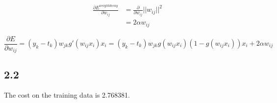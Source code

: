 \documentclass{article}
\begin{document}
\begin{align*}
	\frac{\partial E^{weightdecay}}{\partial w_{ij}} &= \frac{\partial}{\partial w_{ij}} ||w_{ij}||^2 \\&= 2\alpha w_{ij}
\end{align*}

\begin{equation}
\frac{\partial E}{\partial w_{ij}} = (y_k-t_k)w_{jk} g'(w_{ij}x_i) x_i = (y_k-t_k)w_{jk}g(w_{ij}x_i)(1-g(w_{ij}x_i))x_i+2\alpha w_{ij}
\end{equation}

\subsection*{2.2}



The cost on the training data is 2.768381.
\end{document}
